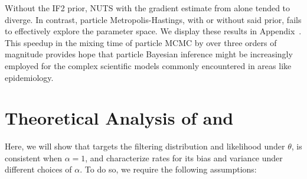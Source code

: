 Without the IF2 prior, NUTS with the gradient estimate from  alone tended to diverge.
In contrast, particle Metropolis-Hastings, with or without said prior, fails to effectively explore the parameter space.
We display these results in Appendix~\suppSecBayesFigs. 
This speedup in the mixing time of particle MCMC by over three orders of magnitude provides hope that particle Bayesian inference might be increasingly employed for the complex scientific models commonly encountered in areas like epidemiology.


\section[Theoretical Analysis of Weight-Discounted Particle Filtering]{Theoretical Analysis of  and }
\label{sec:thms}

Here, we will show that  targets the filtering distribution and likelihood under $\theta$, is consistent when $\alpha=1$, and characterize rates for its bias and variance under different choices of $\alpha$. To do so, we require the following assumptions:

